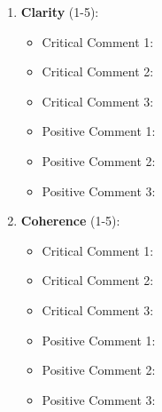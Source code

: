 \documentclass[12pt]{article}
\begin{document}
\begin{enumerate}
    \item \textbf{Clarity} (1-5): \underline{\hspace{2cm}}
    \begin{itemize}
        \item Critical Comment 1: \underline{\hspace{12cm}}
        \item Critical Comment 2: \underline{\hspace{12cm}}
        \item Critical Comment 3: \underline{\hspace{12cm}}
        \item Positive Comment 1: \underline{\hspace{12cm}}
        \item Positive Comment 2: \underline{\hspace{12cm}}
        \item Positive Comment 3: \underline{\hspace{12cm}}
    \end{itemize}

    \vspace{0.5cm}

    \item \textbf{Coherence} (1-5): \underline{\hspace{2cm}}
    \begin{itemize}
        \item Critical Comment 1: \underline{\hspace{12cm}}
        \item Critical Comment 2: \underline{\hspace{12cm}}
        \item Critical Comment 3: \underline{\hspace{12cm}}
        \item Positive Comment 1: \underline{\hspace{12cm}}
        \item Positive Comment 2: \underline{\hspace{12cm}}
        \item Positive Comment 3: \underline{\hspace{12cm}}
    \end{itemize}

    \vspace{0.5cm}


\end{enumerate}
\end{document}
